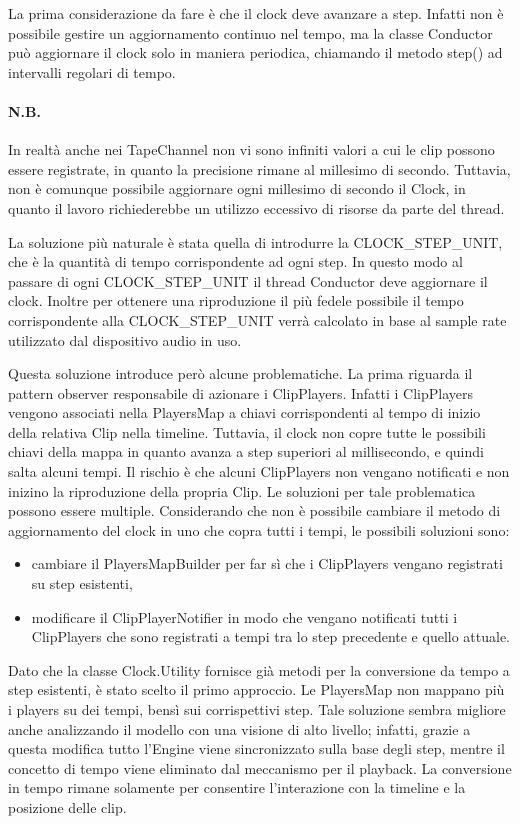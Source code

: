\documentclass[a4paper,12pt]{report}
\begin{document}
La prima considerazione da fare è che il clock deve avanzare a step. Infatti non è possibile gestire un aggiornamento continuo nel tempo, ma la classe Conductor può aggiornare il clock solo in maniera periodica, chiamando il metodo step() ad intervalli regolari di tempo.
\paragraph{N.B.}
In realtà anche nei TapeChannel non vi sono infiniti valori a cui le clip possono essere registrate, in quanto la precisione rimane al millesimo di secondo. Tuttavia, non è comunque possibile aggiornare ogni millesimo di secondo il Clock, in quanto il lavoro richiederebbe un utilizzo eccessivo di risorse da parte del thread.
\parskip 0.2in

La soluzione più naturale è stata quella di introdurre la CLOCK\_STEP\_UNIT, che è la quantità di tempo corrispondente ad ogni step. In questo modo al passare di ogni CLOCK\_STEP\_UNIT il thread Conductor deve aggiornare il clock.
Inoltre per ottenere una riproduzione il più fedele possibile il tempo corrispondente alla CLOCK\_STEP\_UNIT verrà calcolato in base al sample rate utilizzato dal dispositivo audio in uso.
\parskip 0in

Questa soluzione introduce però alcune problematiche. La prima riguarda il pattern observer responsabile di azionare i ClipPlayers. Infatti i ClipPlayers vengono associati nella PlayersMap a chiavi corrispondenti al tempo di inizio della relativa Clip nella timeline. Tuttavia, il clock non copre tutte le possibili chiavi della mappa in quanto avanza a step superiori al millisecondo, e quindi salta alcuni tempi.
Il rischio è che alcuni ClipPlayers non vengano notificati e non inizino la riproduzione della propria Clip.
Le soluzioni per tale problematica possono essere multiple. Considerando che non è possibile cambiare il metodo di aggiornamento del clock in uno che copra tutti i tempi, le possibili soluzioni sono: 
\begin{itemize}
    \item cambiare il PlayersMapBuilder per far sì che i ClipPlayers vengano registrati su step esistenti,
    \item modificare il ClipPlayerNotifier in modo che vengano notificati tutti i ClipPlayers che sono registrati a tempi tra lo step precedente e quello attuale.
\end{itemize}
Dato che la classe Clock.Utility fornisce già metodi per la conversione da tempo a step esistenti, è stato scelto il primo approccio. Le PlayersMap non mappano più i players su dei tempi, bensì sui corrispettivi step.
Tale soluzione sembra migliore anche analizzando il modello con una visione di alto livello; infatti, grazie a questa modifica tutto l’Engine viene sincronizzato sulla base degli step, mentre il concetto di tempo viene eliminato dal meccanismo per il playback. La conversione in tempo rimane solamente per consentire l'interazione con la timeline e la posizione delle clip.
\end{document}

